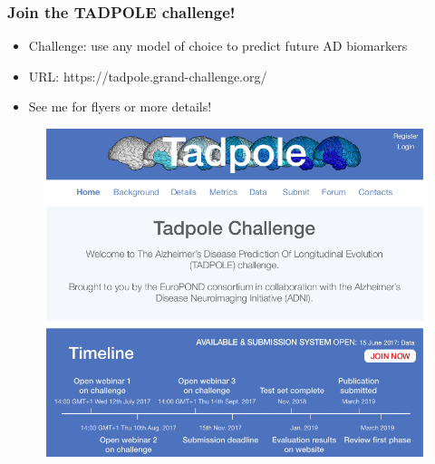 \documentclass[8pt,xcolor=table]{beamer}
\begin{document}
\begin{frame}
\begin{small}
\begin{columns}[T]
\begin{column}{.45\textwidth}
\begin{figure}
\end{figure}
    
\end{column}
\end{columns}
 
\end{small}


\end{frame}


\begin{frame}
\frametitle{Join the TADPOLE challenge!}

\begin{itemize}
 \item Challenge: use any model of choice to predict future AD biomarkers
 \item URL: https://tadpole.grand-challenge.org/
 \item See me for flyers or more details!
\end{itemize}

\begin{figure}
\centering
\includegraphics[scale=0.4,trim=0 270 0 0,clip]{tadpole} 
\end{figure}


\end{frame}



\end{document}

